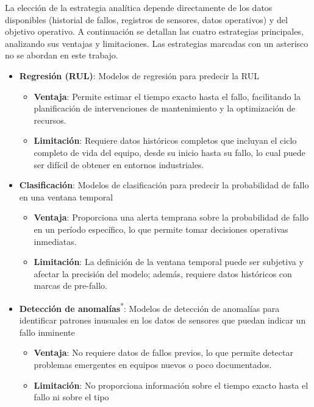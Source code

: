 \documentclass[IB]{TFUOC}
\begin{document}
La elección de la estrategia analítica depende directamente de los datos disponibles (historial de fallos, registros de
sensores, datos operativos) y del objetivo operativo. A continuación se detallan las cuatro estrategias principales,
analizando sus ventajas y limitaciones. Las estrategias marcadas con un asterisco no se abordan en este trabajo.

\begin{itemize}
  \item \textbf{Regresión (RUL)}: Modelos de regresión para predecir la \gls{RUL}
        \begin{itemize}
          \item \textbf{Ventaja}: Permite estimar el tiempo exacto hasta el fallo, facilitando la planificación de
                intervenciones de mantenimiento y la optimización de recursos.
          \item \textbf{Limitación}: Requiere datos históricos completos que incluyan el ciclo completo de vida del
                equipo, desde su inicio hasta su fallo, lo cual puede ser difícil de obtener en entornos industriales.
        \end{itemize}
  \item \textbf{Clasificación}: Modelos de clasificación para predecir la probabilidad de fallo en una ventana temporal
        \begin{itemize}
          \item \textbf{Ventaja}: Proporciona una alerta temprana sobre la probabilidad de fallo en un período
                específico, lo que permite tomar decisiones operativas inmediatas.
          \item \textbf{Limitación}: La definición de la ventana temporal puede ser subjetiva y afectar la precisión del
                modelo; además, requiere datos históricos con marcas de pre-fallo.
        \end{itemize}
  \item \textbf{Detección de anomalías}\textsuperscript{*}: Modelos de detección de anomalías para identificar patrones
        inusuales en los datos de sensores que puedan indicar un fallo inminente
        \begin{itemize}
          \item \textbf{Ventaja}: No requiere datos de fallos previos, lo que permite detectar problemas emergentes en
                equipos nuevos o poco documentados.
          \item \textbf{Limitación}: No proporciona información sobre el tiempo exacto hasta el fallo ni sobre el tipo

\end{itemize}
\end{itemize}
\end{document}
